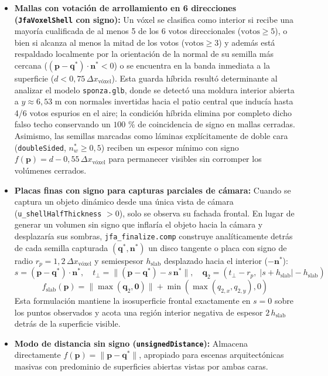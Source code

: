 \begin{itemize}
  \item \textbf{Mallas con votación de arrollamiento en 6 direcciones (\texttt{JfaVoxelShell} con signo):} Un vóxel se clasifica como interior si recibe una mayoría cualificada de al menos 5 de los 6 votos direccionales ($\text{votos} \ge 5$), o bien si alcanza al menos la mitad de los votos ($\text{votos} \ge 3$) y además está respaldado localmente por la orientación de la normal de su semilla más cercana ($(\mathbf{p} - \mathbf{q}^*) \cdot \mathbf{n}^* < 0$) o se encuentra en la banda inmediata a la superficie ($d < 0,75\,\Delta x_{\text{vóxel}}$). Esta guarda híbrida resultó determinante al analizar el modelo \texttt{sponza.glb}, donde se detectó una moldura interior abierta a $y \approx 6,53\text{ m}$ con normales invertidas hacia el patio central que inducía hasta 4/6 votos espurios en el aire; la condición híbrida elimina por completo dicho falso techo conservando un $100$ \% de coincidencia de signo en mallas cerradas. Asimismo, las semillas marcadas como láminas explícitamente de doble cara (\texttt{doubleSided}, $n_w^* \ge 0,5$) reciben un espesor mínimo con signo $f(\mathbf{p}) = d - 0,55\,\Delta x_{\text{vóxel}}$ para permanecer visibles sin corromper los volúmenes cerrados.
  \item \textbf{Placas finas con signo para capturas parciales de cámara:} Cuando se captura un objeto dinámico desde una única vista de cámara (\texttt{u\_shellHalfThickness} $> 0$), solo se observa su fachada frontal. En lugar de generar un volumen sin signo que inflaría el objeto hacia la cámara y desplazaría sus sombras, \texttt{jfa\_finalize.comp} construye analíticamente detrás de cada semilla capturada $(\mathbf{q}^*, \mathbf{n}^*)$ un disco tangente o placa con signo de radio $r_p = 1,2\,\Delta x_{\text{vóxel}}$ y semiespesor $h_{\text{slab}}$ desplazado hacia el interior ($-\mathbf{n}^*$):
  \begin{equation}
    s = (\mathbf{p} - \mathbf{q}^*) \cdot \mathbf{n}^*, \quad t_{\perp} = \|(\mathbf{p} - \mathbf{q}^*) - s\,\mathbf{n}^*\|, \quad \mathbf{q}_2 = \left(t_{\perp} - r_p,\; |s + h_{\text{slab}}| - h_{\text{slab}}\right)
  \end{equation}
  \begin{equation}
    f_{\text{slab}}(\mathbf{p}) = \|\max(\mathbf{q}_2, \mathbf{0})\| + \min(\max(q_{2,x}, q_{2,y}), 0)
  \end{equation}
  Esta formulación mantiene la isosuperficie frontal exactamente en $s = 0$ sobre los puntos observados y acota una región interior negativa de espesor $2\,h_{\text{slab}}$ detrás de la superficie visible.
  \item \textbf{Modo de distancia sin signo (\texttt{unsignedDistance}):} Almacena directamente $f(\mathbf{p}) = \|\mathbf{p} - \mathbf{q}^*\|$, apropiado para escenas arquitectónicas masivas con predominio de superficies abiertas vistas por ambas caras.
\end{itemize}

